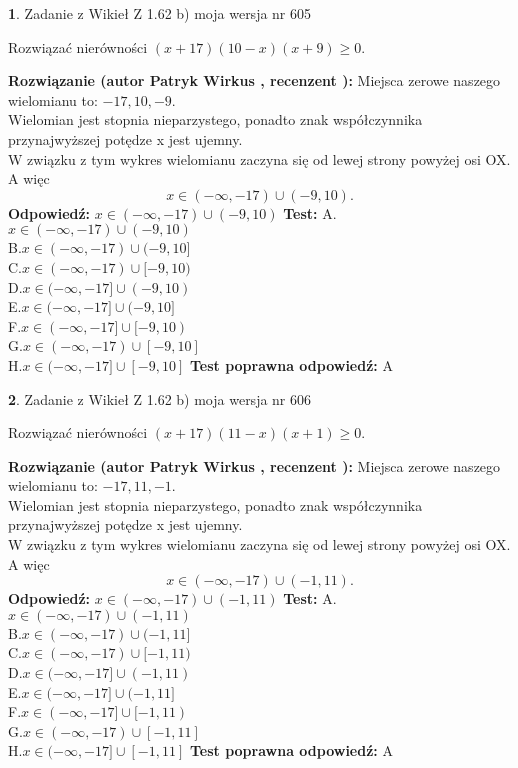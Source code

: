 \documentclass[12pt, a4paper]{article}
\theoremstyle{definition} %
\newtheorem{zad}{}
\newcommand{\zadStart}[1]{\begin{zad}#1\newline}
\newcommand{\zadStop}{\end{zad}}
\newcommand{\rozwStart}[2]{\noindent \textbf{Rozwiązanie (autor #1 , recenzent #2): }\newline}
\newcommand{\rozwStop}{\newline}
\newcommand{\odpStart}{\noindent \textbf{Odpowiedź:}\newline}
\newcommand{\odpStop}{\newline}
\newcommand{\testStart}{\noindent \textbf{Test:}\newline}
\newcommand{\testStop}{\newline}
\newcommand{\kluczStart}{\noindent \textbf{Test poprawna odpowiedź:}\newline}
\newcommand{\kluczStop}{\newline}
\begin{document}
\zadStart{Zadanie z Wikieł Z 1.62 b) moja wersja nr 605}

Rozwiązać nierówności $(x+17)(10-x)(x+9)\ge0$.
\zadStop
\rozwStart{Patryk Wirkus}{}
Miejsca zerowe naszego wielomianu to: $-17, 10, -9$.\\
Wielomian jest stopnia nieparzystego, ponadto znak współczynnika przy\linebreak najwyższej potędze x jest ujemny.\\ W związku z tym wykres wielomianu zaczyna się od lewej strony powyżej osi OX. A więc $$x \in (-\infty,-17) \cup (-9,10).$$
\rozwStop
\odpStart
$x \in (-\infty,-17) \cup (-9,10)$
\odpStop
\testStart
A.$x \in (-\infty,-17) \cup (-9,10)$\\
B.$x \in (-\infty,-17) \cup (-9,10]$\\
C.$x \in (-\infty,-17) \cup [-9,10)$\\
D.$x \in (-\infty,-17] \cup (-9,10)$\\
E.$x \in (-\infty,-17] \cup (-9,10]$\\
F.$x \in (-\infty,-17] \cup [-9,10)$\\
G.$x \in (-\infty,-17) \cup [-9,10]$\\
H.$x \in (-\infty,-17] \cup [-9,10]$
\testStop
\kluczStart
A
\kluczStop



\zadStart{Zadanie z Wikieł Z 1.62 b) moja wersja nr 606}

Rozwiązać nierówności $(x+17)(11-x)(x+1)\ge0$.
\zadStop
\rozwStart{Patryk Wirkus}{}
Miejsca zerowe naszego wielomianu to: $-17, 11, -1$.\\
Wielomian jest stopnia nieparzystego, ponadto znak współczynnika przy\linebreak najwyższej potędze x jest ujemny.\\ W związku z tym wykres wielomianu zaczyna się od lewej strony powyżej osi OX. A więc $$x \in (-\infty,-17) \cup (-1,11).$$
\rozwStop
\odpStart
$x \in (-\infty,-17) \cup (-1,11)$
\odpStop
\testStart
A.$x \in (-\infty,-17) \cup (-1,11)$\\
B.$x \in (-\infty,-17) \cup (-1,11]$\\
C.$x \in (-\infty,-17) \cup [-1,11)$\\
D.$x \in (-\infty,-17] \cup (-1,11)$\\
E.$x \in (-\infty,-17] \cup (-1,11]$\\
F.$x \in (-\infty,-17] \cup [-1,11)$\\
G.$x \in (-\infty,-17) \cup [-1,11]$\\
H.$x \in (-\infty,-17] \cup [-1,11]$
\testStop
\kluczStart
A
\kluczStop
\end{document}
